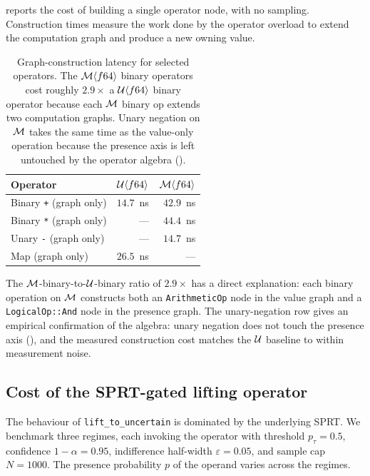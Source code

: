  reports the cost of building a single operator
node, with no sampling. Construction times measure the work done by the
operator overload to extend the computation graph and produce a new owning
value.

\begin{table}[h]
\centering
\small
\begin{tabular}{@{}lrr@{}}
\toprule
Operator & $\mathcal{U}\langle f64 \rangle$ & $\mathcal{M}\langle f64 \rangle$ \\
\midrule
Binary \texttt{+} (graph only)    & $14.7$~ns & $42.9$~ns \\
Binary \texttt{*} (graph only)    & ---       & $44.4$~ns \\
Unary \texttt{-} (graph only)     & ---       & $14.7$~ns \\
Map (graph only)                  & $26.5$~ns & ---       \\
\bottomrule
\end{tabular}
\caption{Graph-construction latency for selected operators. The
$\mathcal{M}\langle f64 \rangle$ binary operators cost roughly $2.9\times$ a
$\mathcal{U}\langle f64 \rangle$ binary operator because each
$\mathcal{M}$ binary op extends two computation graphs. Unary negation on
$\mathcal{M}$ takes the same time as the value-only operation because the
presence axis is left untouched by the operator algebra
().}
\label{tab:construction}
\end{table}

The $\mathcal{M}$-binary-to-$\mathcal{U}$-binary ratio of $2.9\times$ has a direct
explanation: each binary operation on $\mathcal{M}$ constructs both an
\texttt{ArithmeticOp} node in the value graph and a \texttt{LogicalOp::And}
node in the presence graph. The unary-negation row gives an empirical
confirmation of the algebra: unary negation does not touch the presence
axis (), and the measured construction cost matches the
$\mathcal{U}$ baseline to within measurement noise.

\subsection{Cost of the SPRT-gated lifting operator}
\label{sec:eval:sprt}

The behaviour of \texttt{lift\_to\_uncertain} is dominated by the
underlying SPRT. We benchmark three regimes, each invoking the operator
with threshold $p_\tau = 0.5$, confidence $1 - \alpha = 0.95$, indifference
half-width $\varepsilon = 0.05$, and sample cap $N = 1000$. The presence
probability $p$ of the operand varies across the regimes.

